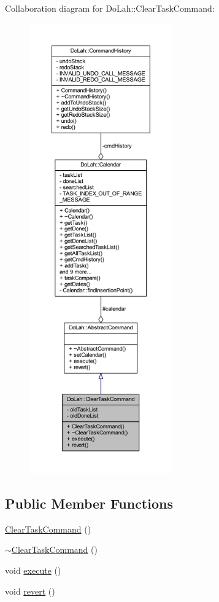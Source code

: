 Collaboration diagram for Do\+Lah\+:\+:Clear\+Task\+Command\+:\nopagebreak
\begin{figure}[H]
\begin{center}
\leavevmode
\includegraphics[height=550pt]{class_do_lah_1_1_clear_task_command__coll__graph}
\end{center}
\end{figure}
\subsection*{Public Member Functions}
\begin{DoxyCompactItemize}
\item 
\hyperlink{class_do_lah_1_1_clear_task_command_a64376e4764af9d479bb38d55a6bb1b06}{Clear\+Task\+Command} ()
\item 
\hyperlink{class_do_lah_1_1_clear_task_command_a7ef9ade1aadbcc3a3714aedc569fb5b5}{$\sim$\+Clear\+Task\+Command} ()
\item 
void \hyperlink{class_do_lah_1_1_clear_task_command_abdfcb4df8381737ee5682a706c9828d2}{execute} ()
\item 
void \hyperlink{class_do_lah_1_1_clear_task_command_aa1d5a57fb19de0018460ff9e8cb14a5c}{revert} ()
\end{DoxyCompactItemize}

